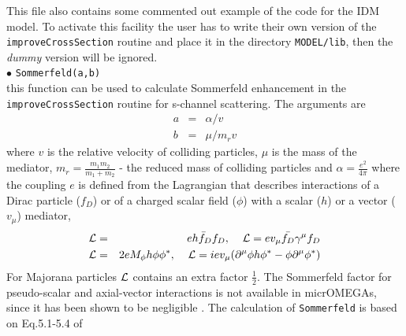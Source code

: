 \documentclass[12pt,a4paper]{article}
\begin{document}
 This file also  contains some commented out example of the code for the IDM model.
 To activate this facility  the user has to write their own
version of the {\tt improveCrossSection} routine and place it  in the directory
\verb|MODEL/lib|,  then the {\it dummy} version will be ignored.
\\
%
\noindent$\bullet$ \verb|Sommerfeld(a,b)|\\ 
this function can be used  to calculate  Sommerfeld enhancement  in the {\tt
improveCrossSection} routine for s-channel scattering.  The arguments are 
\begin{eqnarray}
   a &=& \alpha/v \\
   b &=& \mu/m_r v    
\end{eqnarray} 
where $v$ is the relative velocity of colliding particles, $\mu$ is the mass of the
mediator, $m_r=\frac{m_1 m_2}{m_1+m_2}$ - the reduced mass of colliding
particles and $\alpha=\frac{e^2}{4\pi}$ where the coupling $e$ is defined from the Lagrangian
that describes interactions of a Dirac particle ($f_D$)  or of a  charged  scalar field  ($\phi$)   with a scalar ($h$) or a vector ($v_\mu$) mediator, 
\begin{eqnarray}
 {\cal L}&=& e h \bar{f}_D f_D, \;\;\;\;  {\cal L}=e v_\mu \bar{f_D}\gamma^\mu f_D\nonumber\\
 {\cal L}&=&2e M_\phi h \phi\phi^*, \;\;\;\;  {\cal L}= i e v_\mu  (\partial^\mu \phi h \phi^* - \phi \partial^\mu \phi^*) 
\end{eqnarray}
For Majorana particles ${\cal L}$  contains an extra factor $\frac{1}{2}$.  
The Sommerfeld factor for  pseudo-scalar  and axial-vector   interactions is not available in micrOMEGAs, since it has been shown to be negligible  \cite{Agrawal:2020lea}.  The calculation of {\tt Sommerfeld} is based on Eq.5.1-5.4 of \cite{Iengo_2009}
\end{document}
